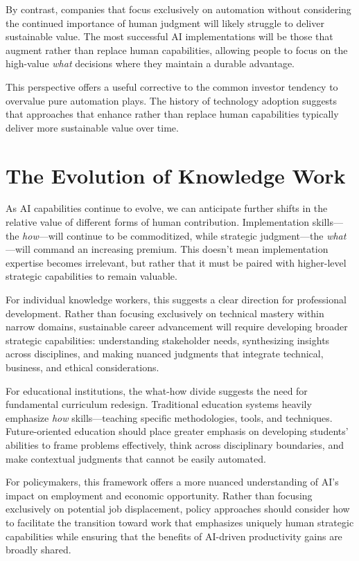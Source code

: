 \documentclass[
  Letterpaper,
]{scrbook}
\begin{document}
By contrast, companies that focus exclusively on automation without
considering the continued importance of human judgment will likely
struggle to deliver sustainable value. The most successful AI
implementations will be those that augment rather than replace human
capabilities, allowing people to focus on the high-value \emph{what}
decisions where they maintain a durable advantage.

This perspective offers a useful corrective to the common investor
tendency to overvalue pure automation plays. The history of technology
adoption suggests that approaches that enhance rather than replace human
capabilities typically deliver more sustainable value over time.

\section{The Evolution of Knowledge
Work}\label{the-evolution-of-knowledge-work-1}

As AI capabilities continue to evolve, we can anticipate further shifts
in the relative value of different forms of human contribution.
Implementation skills---the \emph{how}---will continue to be
commoditized, while strategic judgment---the \emph{what}---will command
an increasing premium. This doesn't mean implementation expertise
becomes irrelevant, but rather that it must be paired with higher-level
strategic capabilities to remain valuable.

For individual knowledge workers, this suggests a clear direction for
professional development. Rather than focusing exclusively on technical
mastery within narrow domains, sustainable career advancement will
require developing broader strategic capabilities: understanding
stakeholder needs, synthesizing insights across disciplines, and making
nuanced judgments that integrate technical, business, and ethical
considerations.

For educational institutions, the what-how divide suggests the need for
fundamental curriculum redesign. Traditional education systems heavily
emphasize \emph{how} skills---teaching specific methodologies, tools,
and techniques. Future-oriented education should place greater emphasis
on developing students' abilities to frame problems effectively, think
across disciplinary boundaries, and make contextual judgments that
cannot be easily automated.

For policymakers, this framework offers a more nuanced understanding of
AI's impact on employment and economic opportunity. Rather than focusing
exclusively on potential job displacement, policy approaches should
consider how to facilitate the transition toward work that emphasizes
uniquely human strategic capabilities while ensuring that the benefits
of AI-driven productivity gains are broadly shared.
\end{document}
